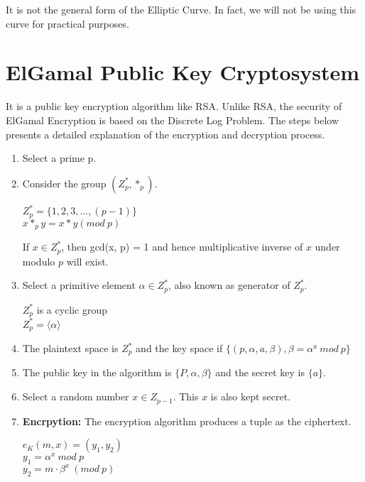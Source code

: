 \documentclass[11pt]{article}
\begin{document}
It is not the general form of the Elliptic Curve. In fact, we will not be using this curve for practical purposes.

\section{ElGamal Public Key Cryptosystem}
It is a public key encryption algorithm like RSA. Unlike RSA, the security of ElGamal Encryption is based on the Discrete Log Problem. The steps below presents a detailed explanation of the encryption and decryption process.
\begin{enumerate}
    \item Select a prime p.
    \item Consider the group $(Z_p^*, *_p)$.
    \begin{center}
        $Z_p^* = \{1,2,3,\hdots,(p-1)\}$\\
        \vspace{1mm}
        $x *_p y = x * y (mod \ p)$\\
        \vspace{1mm}
    \end{center}
    If $x \in Z_p^*$, then gcd(x, p) = 1 and hence multiplicative inverse of $x$ under modulo $p$ will exist.
    \item Select a primitive element $\alpha \in Z_p^*$, also known as generator of $Z_p^*$.
    \begin{center}
        $Z_p^*$ is a cyclic group\\
        $Z_p^* = \langle \alpha \rangle$\\
    \end{center}

    \item The plaintext space is $Z_p^*$ and the key space if $\{(p, \alpha, a, \beta), \beta = \alpha^a \ mod \ p\}$
    \item The public key in the algorithm is $\{P, \alpha, \beta\}$ and the secret key is $\{a\}$.
    \item Select a random number $x \in Z_{p-1}$. This $x$ is also kept secret.
    \item \textbf{Encrpytion:} The encryption algorithm produces a tuple as the ciphertext. 
    \begin{center}
        $e_K(m, x) = (y_1, y_2)$\\
        \vspace{1mm}
        $y_1 = \alpha^x \ mod \ p$\\
        \vspace{1mm}
        $y_2 = m \cdot \beta^x \ (mod \ p)$
    \end{center}


\end{enumerate}
\end{document}
